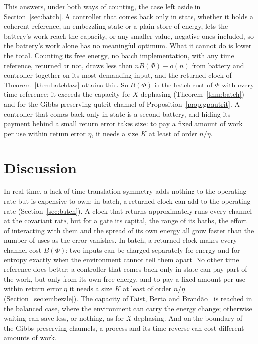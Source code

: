 \documentclass[11pt]{article}
\theoremstyle{definition}
\theoremstyle{remark}
\begin{document}
This answers, under both ways of counting, the case left aside in Section~\ref{sec:batch}. A controller that comes back only in state, whether it holds a coherent reference, an embezzling state or a plain store of energy, lets the battery's work reach the capacity, or any smaller value, negative ones included, so the battery's work alone has no meaningful optimum. What it cannot do is lower the total. Counting its free energy, no batch implementation, with any time reference, returned or not, draws less than $nB(\Phi)-o(n)$ from battery and controller together on its most demanding input, and the returned clock of Theorem~\ref{thm:batchlaw} attains this. So $B(\Phi)$ is the batch cost of $\Phi$ with every time reference; it exceeds the capacity for $X$-dephasing (Theorem~\ref{thm:batch}) and for the Gibbs-preserving qutrit channel of Proposition~\ref{prop:gpqutrit}. A controller that comes back only in state is a second battery, and hiding its payment behind a small return error takes size: to pay a fixed amount of work per use within return error $\eta$, it needs a size $K$ at least of order $n/\eta$.

\section{Discussion}\label{sec:discussion}

In real time, a lack of time-translation symmetry adds nothing to the operating rate but is expensive to own; in batch, a returned clock can add to the operating rate (Section~\ref{sec:batch}). A clock that returns approximately runs every channel at the covariant rate, but for a gate its capital, the range of its baths, the effort of interacting with them and the spread of its own energy all grow faster than the number of uses as the error vanishes. In batch, a returned clock makes every channel cost $B(\Phi)$: two inputs can be charged separately for energy and for entropy exactly when the environment cannot tell them apart. No other time reference does better: a controller that comes back only in state can pay part of the work, but only from its own free energy, and to pay a fixed amount per use within return error $\eta$ it needs a size $K$ at least of order $n/\eta$ (Section~\ref{sec:embezzle}). The capacity of Faist, Berta and Brand\~ao~\cite{FBB19,FBB21} is reached in the balanced case, where the environment can carry the energy change; otherwise waiting can save less, or nothing, as for $X$-dephasing. And on the boundary of the Gibbs-preserving channels, a process and its time reverse can cost different amounts of work.
\end{document}
